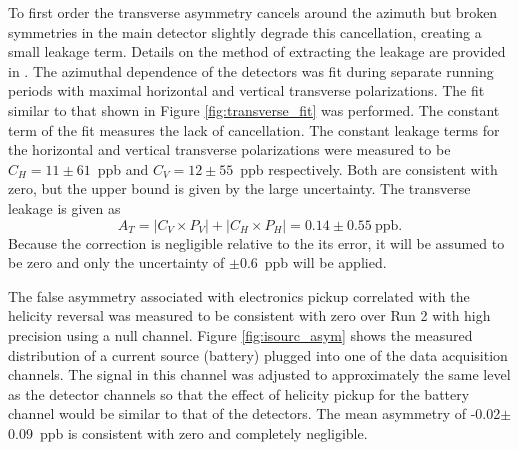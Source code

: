 To first order the transverse asymmetry cancels around the azimuth but broken symmetries in the main detector slightly degrade this cancellation, creating a small leakage term. Details on the method of extracting the leakage are provided in \cite{Waidyawansa}. The azimuthal dependence of the detectors was fit during separate running periods with maximal horizontal and vertical transverse polarizations. The fit similar to that shown in Figure \ref{fig:transverse_fit} was performed. The constant term of the fit measures the lack of cancellation. The constant leakage terms for the horizontal and vertical transverse polarizations were measured to be $C_H=11\pm 61$~ppb and $C_V=12\pm 55$~ppb respectively. Both are consistent with zero, but the upper bound is given by the large uncertainty. The transverse leakage is given as  
\[
A_T=\left|C_V\times P_V\right|+\left|C_H\times P_H\right|=0.14\pm0.55~\text{ppb.}
\]
Because the correction is negligible relative to the its error, it will be assumed to be zero and only the uncertainty of $\pm0.6$~ppb will be applied. 

 The false asymmetry associated with electronics pickup correlated with the helicity reversal was measured to be consistent with zero over Run 2 with high precision using a null channel. Figure \ref{fig:isourc_asym} shows the measured distribution of a current source (battery) plugged into one of the \Qs data acquisition channels. The signal in this channel was adjusted to approximately the same level as the detector channels so that the effect of helicity pickup for the battery channel would be similar to that of the detectors. The mean asymmetry of -0.02$\pm$0.09~ppb is consistent with zero and completely negligible.

